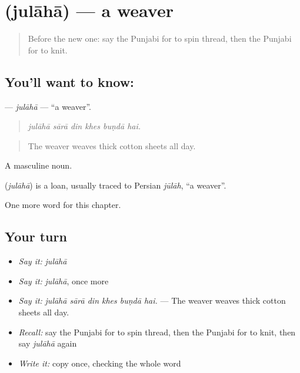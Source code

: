 \section[\texorpdfstring{\pa{ਜੁਲਾਹਾ} (julāhā)}{ਜੁਲਾਹਾ (julāhā)}]{ (julāhā) — a weaver}

\label{lesson:PA-C334-julaha}



\begin{quote}
Before the new one: say the Punjabi for to spin thread, then the Punjabi for to knit.
\end{quote}

\subsection*{You'll want to know: }
\textbf{} — \emph{julāhā} — \textquotedblleft{}a weaver\textquotedblright{}.

\begin{quote}
     
\end{quote}

\begin{quote}
\emph{julāhā sārā din khes buṇdā hai.}
\end{quote}

\begin{quote}
The weaver weaves thick cotton sheets all day.
\end{quote}

A masculine noun.

\begin{cousinweb}
\textbf{} (\emph{julāhā}) is a loan, usually traced to Persian \emph{jūlāh}, \textquotedblleft{}a weaver\textquotedblright{}.
\end{cousinweb}

\begin{grammarlens}[title={What you've built}]
One more word for this chapter.
\end{grammarlens}

\subsection*{Your turn}
\begin{itemize}
\raggedright
  \item \emph{Say it:} \emph{julāhā}
  \item \emph{Say it:} \emph{julāhā}, once more
  \item \emph{Say it:} \emph{julāhā sārā din khes buṇdā hai.} — The weaver weaves thick cotton sheets all day.
  \item \emph{Recall:} say the Punjabi for to spin thread, then the Punjabi for to knit, then say \emph{julāhā} again
  \item \emph{Write it:} copy \textbf{} once, checking the whole word
\end{itemize}

